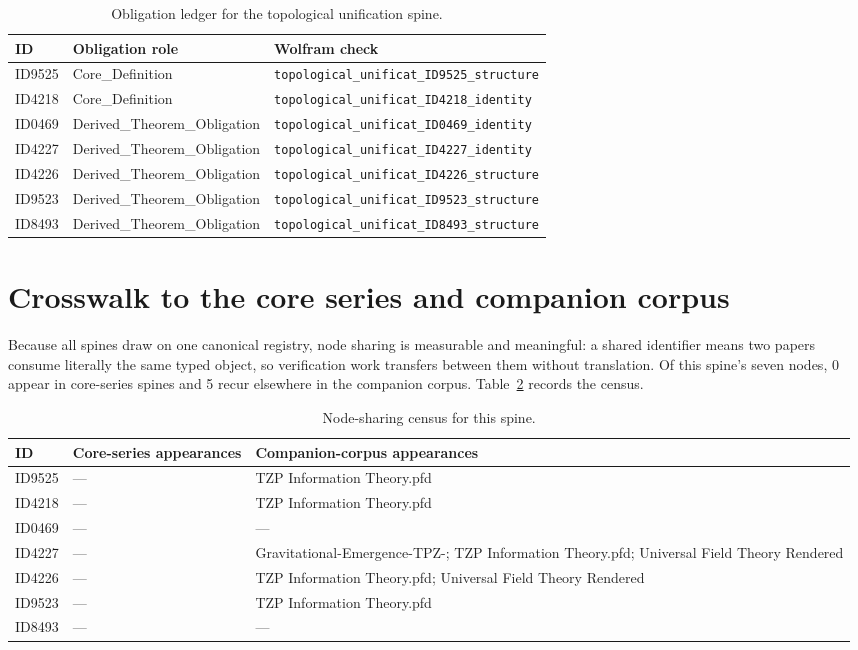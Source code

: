 \documentclass[11pt]{article}
\theoremstyle{remark}
\begin{document}
\begin{table}[ht]
\centering
\small
\caption{Obligation ledger for the topological unification spine.}
\label{tab:obligations}
\begin{tabular}{llp{6.2cm}}
\toprule
ID & Obligation role & Wolfram check \\
\midrule
ID9525 & Core\_Definition & \texttt{topological\_unificat\_ID9525\_structure} \\
ID4218 & Core\_Definition & \texttt{topological\_unificat\_ID4218\_identity} \\
ID0469 & Derived\_Theorem\_Obligation & \texttt{topological\_unificat\_ID0469\_identity} \\
ID4227 & Derived\_Theorem\_Obligation & \texttt{topological\_unificat\_ID4227\_identity} \\
ID4226 & Derived\_Theorem\_Obligation & \texttt{topological\_unificat\_ID4226\_structure} \\
ID9523 & Derived\_Theorem\_Obligation & \texttt{topological\_unificat\_ID9523\_structure} \\
ID8493 & Derived\_Theorem\_Obligation & \texttt{topological\_unificat\_ID8493\_structure} \\
\bottomrule
\end{tabular}
\end{table}

\section{Crosswalk to the core series and companion corpus}
\label{sec:crosswalk}

Because all spines draw on one canonical registry, node sharing is measurable and meaningful: a shared identifier means two papers consume literally the same typed object, so verification work transfers between them without translation. Of this spine's seven nodes, 0 appear in core-series spines and 5 recur elsewhere in the companion corpus. Table~\ref{tab:crosswalk} records the census.

\begin{table}[ht]
\centering
\small
\caption{Node-sharing census for this spine.}
\label{tab:crosswalk}
\begin{tabular}{lp{4.4cm}p{6.6cm}}
\toprule
ID & Core-series appearances & Companion-corpus appearances \\
\midrule
ID9525 & --- & TZP Information Theory.pfd \\
ID4218 & --- & TZP Information Theory.pfd \\
ID0469 & --- & --- \\
ID4227 & --- & Gravitational-Emergence-TPZ-; TZP Information Theory.pfd; Universal Field Theory Rendered \\
ID4226 & --- & TZP Information Theory.pfd; Universal Field Theory Rendered \\
ID9523 & --- & TZP Information Theory.pfd \\
ID8493 & --- & --- \\
\bottomrule
\end{tabular}
\end{table}
\end{document}
